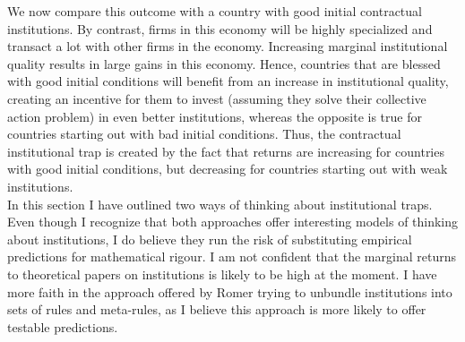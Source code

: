 \documentclass[12pt]{article}%
\begin{document}
We now compare this outcome with a country with good initial contractual institutions. By contrast, firms in this economy will be highly specialized and transact a lot with other firms in the economy. Increasing marginal institutional quality results in large gains in this economy. Hence, countries that are blessed with good initial conditions will benefit from an increase in institutional quality, creating an incentive for them to invest (assuming they solve their collective action problem) in even better institutions, whereas the opposite is true for countries starting out with bad initial conditions. Thus, the contractual institutional trap is created by the fact that returns are increasing for countries with good initial conditions, but decreasing for countries starting out with weak institutions. \\

In this section I have outlined two ways of thinking about institutional traps. Even though I recognize that both approaches offer interesting models of thinking about institutions, I do believe they run the risk of substituting empirical predictions for mathematical rigour. I am not confident that the marginal returns to theoretical papers on institutions is likely to be high at the moment. I have more faith in the approach offered by Romer trying to unbundle institutions into sets of rules and meta-rules, as I believe this approach is more likely to offer testable predictions. 
\end{document}
